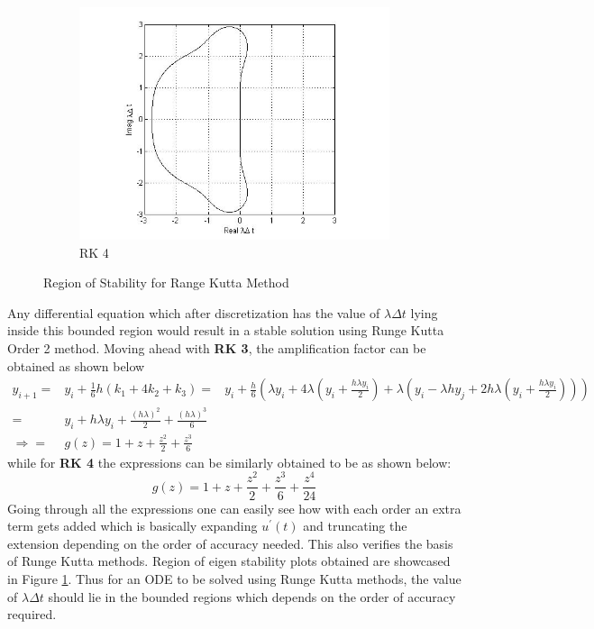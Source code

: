 \documentclass[a4paper,12pt]{report}
\begin{document}
\begin{figure}[h!]
\begin{subfigure}[b]{0.4\textwidth}
		\includegraphics[width=\textwidth]{rk4.jpg}
                \caption{RK 4}
	\end{subfigure}
	\caption{Region of Stability for Range Kutta Method}
	\label{regofstab}
\end{figure}
Any differential equation which after discretization has the value of $\lambda \Delta t$ lying inside this bounded region would result in a stable solution using Runge Kutta Order 2 method. Moving ahead with \textbf{RK 3}, the amplification factor can be obtained as shown below
\begin{eqnarray}
y_{i+1} =& y_i + \frac{1}{6}h(k_1 + 4k_2 + k_3)
=& y_i + \frac{h}{6}(\lambda y_i +4\lambda(y_i+\frac{h\lambda y_i}{2})+\lambda (y_i -\lambda hy_j+2h\lambda(y_i+\frac{h\lambda y_i}{2}))) \nonumber \\
=& y_i + h\lambda y_i + \frac{(h\lambda)^2}{2} + \frac{(h\lambda)^3}{6} \nonumber \\
\Rightarrow =& g(z) = 1 + z + \frac{z^2}{2}+\frac{z^3}{6} \nonumber
\end{eqnarray}
while for \textbf{RK 4} the expressions can be similarly obtained to be as shown below:
\[ g(z) = 1 + z+ \frac{z^2}{2}+\frac{z^3}{6} + \frac{z^4}{24} \] 
Going through all the expressions one can easily see how with each order an extra term gets added which is basically expanding $u^{\prime}(t)$ and truncating the extension depending on the order of accuracy needed. This also verifies the basis of Runge Kutta methods. Region of eigen stability plots obtained are showcased in Figure \ref{regofstab}. Thus for an ODE to be solved using Runge Kutta methods, the value of $\lambda \Delta t$ should lie in the bounded regions which depends on the order of accuracy required.
\end{document}
